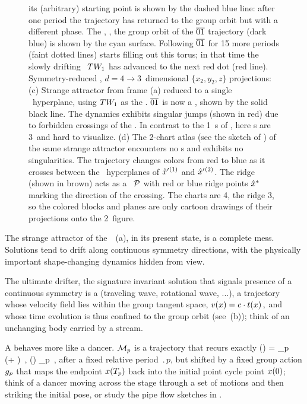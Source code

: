 \documentclass[aip,cha,reprint,
secnumarabic,
nofootinbib, tightenlines,
nobibnotes, showkeys, showpacs,
groupedaddress
]{revtex4-1}
\begin{document}
\begin{figure}
{  its (arbitrary) starting point is shown by the dashed blue line: after
  one period the trajectory has returned to the group orbit but with a
  different phase. The \wurst, \ie, the group orbit of the $\overline{01}$
  trajectory (dark blue) is shown by the cyan surface. Following
  $\overline{01}$ for 15 more periods (faint dotted lines) starts filling
  out this torus; in that time the slowly drifting \reqv\ $TW_{1}$
  has advanced to the next red dot (red line).
Symmetry-reduced \cLf, $d=4 \to 3$~dimensional $\{x_2,y_2,z\}$ projections:
 (c)
 Strange attractor from frame (a) reduced to a single \slice\ hyperplane,
 using $TW_{1}$ as the \template. $\overline{01}$ is now a {\po}, shown
 by the solid black line. The dynamics exhibits singular jumps
 (shown in red) due to forbidden crossings of the \chartBord. In contrast
 to the 1\dmn\ \poincBord s of , here \chartBord s
 are 3\dmn\ and hard to visualize.
 (d)
The 2-chart atlas (see the sketch of ) of the same
strange attractor encounters no \chartBord s and exhibits no
singularities. The trajectory changes colors from red to blue as it
crosses between the \slice\ hyperplanes of ${\hat{x}'}{}^{(1)}$ and
${\hat{x}'}{}^{(2)}$. The ridge (shown in brown) acts as a \PoincSec\
${\cal P}$ with red or blue ridge points $\hat{x}^*$ marking the direction
of the crossing. The charts are 4\dmn, the ridge 3\dmn, so the colored
blocks and planes are only cartoon drawings of their projections onto the
2\dmn\ figure.
  }
\label{fig:CLf01group}
\end{figure}

The strange attractor of the \cLf\ \,(a), in its
present state, is a complete mess. Solutions tend to drift along
continuous symmetry directions, with the physically important
shape-changing dynamics hidden from view.

The ultimate drifter, the signature invariant solution that signals
presence of a continuous symmetry is a {\em \reqv} (traveling wave,
rotational wave, ...), a trajectory whose velocity field lies within the
group tangent space,
\(
v(x) = c \cdot t(x)
\,,
\) %
and whose time evolution is thus confined to the group orbit (see
\reffig{fig:CLf01group}\,(b)); think of an unchanging body carried by a
stream.

A {\em \rpo} behaves more like a dancer. ${\cal M}_p$ is a trajectory that
recurs exactly
\beq
\ssp(\zeit) = \LieEl_p \, \ssp(\zeit +  )
    \,,\qquad
\ssp(\zeit) \in \pS_p
    \,,
after a fixed {relative period} $\period{p}$, but shifted by a fixed
group action ${g_p}$ that maps the endpoint $x ({T_{p}}) $ back
into the initial point cycle point $x (0) $; think of a dancer moving
across the stage through a set of motions and then striking the initial
pose,\rf{ShWi06} or study the pipe flow sketches in .
\end{document}
